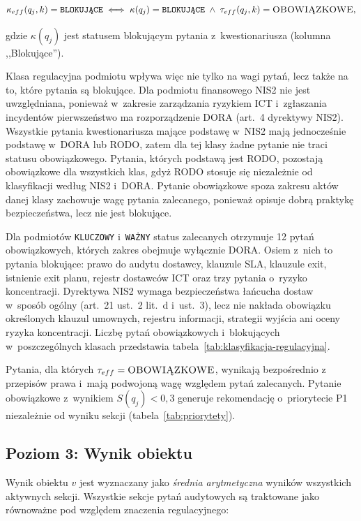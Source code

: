 \begin{equation}
\kappa_{eff}(q_j, k) = \texttt{BLOKUJĄCE}
\iff
\kappa(q_j) = \texttt{BLOKUJĄCE}
\;\wedge\;
\tau_{eff}(q_j, k) = \textsc{OBOWIĄZKOWE},
\label{eq:kappa-eff}
\end{equation}

\noindent gdzie $\kappa(q_j)$ jest statusem blokującym pytania z~kwestionariusza (kolumna ,,Blokujące'').

\noindent Klasa regulacyjna podmiotu wpływa więc nie tylko na wagi
pytań, lecz także na to, które pytania są blokujące.
Dla podmiotu finansowego NIS2 nie jest uwzględniana, ponieważ w~zakresie
zarządzania ryzykiem ICT i~zgłaszania incydentów pierwszeństwo ma
rozporządzenie DORA (art.~4 dyrektywy NIS2). Wszystkie pytania
kwestionariusza mające podstawę w~NIS2 mają jednocześnie podstawę
w~DORA lub RODO, zatem dla tej klasy żadne pytanie nie traci statusu
obowiązkowego. Pytania, których podstawą jest RODO, pozostają
obowiązkowe dla wszystkich klas, gdyż RODO stosuje się niezależnie
od klasyfikacji według NIS2 i~DORA. Pytanie obowiązkowe spoza zakresu
aktów danej klasy zachowuje wagę pytania zalecanego, ponieważ opisuje
dobrą praktykę bezpieczeństwa, lecz nie jest blokujące.

Dla podmiotów \texttt{KLUCZOWY} i~\texttt{WAŻNY} status zalecanych
otrzymuje 12 pytań obowiązkowych, których zakres obejmuje wyłącznie DORA.
Osiem z~nich to pytania blokujące: prawo do audytu dostawcy,
klauzule SLA, klauzule exit, istnienie exit planu, rejestr
dostawców ICT oraz trzy pytania o~ryzyko koncentracji. Dyrektywa NIS2
wymaga bezpieczeństwa łańcucha dostaw w~sposób ogólny
(art.~21 ust.~2 lit.~d i~ust.~3), lecz nie nakłada obowiązku
określonych klauzul umownych, rejestru informacji, strategii wyjścia
ani oceny ryzyka koncentracji. Liczbę pytań obowiązkowych i~blokujących
w~poszczególnych klasach przedstawia tabela~\ref{tab:klasyfikacja-regulacyjna}.

Pytania, dla których $\tau_{eff} = \textsc{OBOWIĄZKOWE}$, wynikają
bezpośrednio z przepisów prawa i~mają podwojoną wagę
względem pytań zalecanych. Pytanie obowiązkowe z~wynikiem $S(q_j) < 0{,}3$
generuje rekomendację o~priorytecie P1 niezależnie od wyniku sekcji
(tabela~\ref{tab:priorytety}).


\subsection{Poziom 3: Wynik obiektu}
\label{sec:wynik-obiektu}


Wynik obiektu $v$ jest wyznaczany jako
\textit{średnia arytmetyczna} wyników wszystkich
aktywnych sekcji. Wszystkie sekcje pytań audytowych
są traktowane jako równoważne pod względem znaczenia
regulacyjnego:

